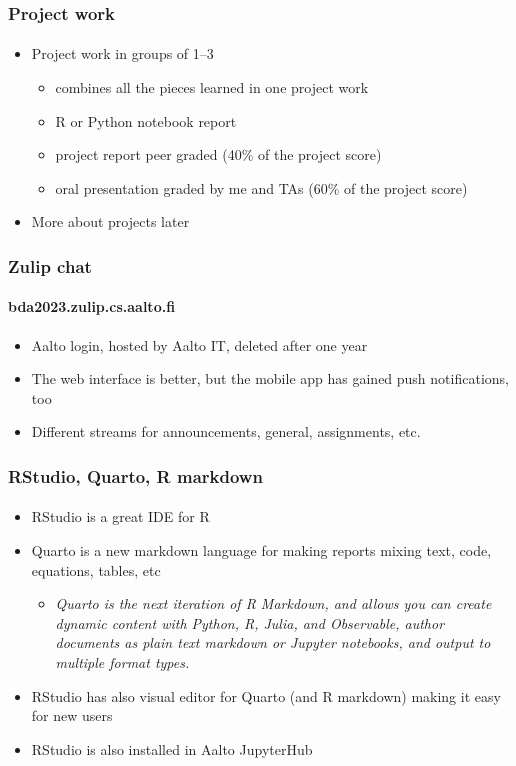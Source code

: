 \documentclass[english,t]{beamer}
\begin{document}
\begin{frame}
  \frametitle{Project work}  %
  \framesubtitle{}
  \begin{itemize}
  \item Project work in groups of 1--3
    \begin{itemize}
    \item combines all the pieces learned in one project work
    \item R or Python notebook report
    \item project report peer graded (40\% of the project score)
    \item oral presentation graded by me and TAs (60\% of the project score)
    \end{itemize}
  \item More about projects later
  \end{itemize}
  
\end{frame}

\begin{frame}

  \frametitle{Zulip chat}  %
  \framesubtitle{bda2023.zulip.cs.aalto.fi}

  \begin{itemize}
  \item Aalto login, hosted by Aalto IT, deleted after one year
  \item The web interface is better, but the mobile app has gained
    push notifications, too
  \item Different streams for announcements, general, assignments, etc.
  \end{itemize}
  
\end{frame}

\begin{frame}

  \frametitle{RStudio, Quarto, R markdown}  %
  \framesubtitle{}

  \begin{itemize}
  \item RStudio is a great IDE for R
  \item Quarto is a new markdown language for making reports mixing
    text, code, equations, tables, etc
    \begin{itemize}
    \item \textit{Quarto is the next iteration of R Markdown, and
        allows you can create dynamic content with Python, R, Julia,
        and Observable, author documents as plain text markdown or
        Jupyter notebooks, and output to multiple format types.}
    \end{itemize}
  \item RStudio has also visual editor for Quarto (and R markdown)
    making it easy for new users
  \item RStudio is also installed in Aalto JupyterHub
  \end{itemize}
  
\end{frame}  
\end{document}
